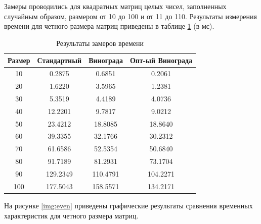 Замеры проводились для квадратных матриц целых чисел, заполненных случайным образом, размером от 10 до 100 и от 11 до 110. Результаты измерения времени для четного размера матриц приведены в таблице \ref{tbl:time_even} (в мс).

\begin{table}[h]
    \begin{center}
        \begin{threeparttable}
        \captionsetup{justification=raggedright,singlelinecheck=off}
        \caption{Результаты замеров времени}
        \label{tbl:time_even}
        \begin{tabular}{|c|c|c|c|}
            \hline
            Размер & Стандартный & Винограда & Опт-ый Винограда  \\
            \hline
		    10 & 0.2875 & 0.6851 & 0.2061 \\
			\hline
			20 & 1.6220 & 3.5965 & 1.2381 \\
			\hline
			30 & 5.3519 & 4.4189 & 4.0736 \\
			\hline
			40 & 12.2201 & 9.7817 & 9.0212 \\
			\hline
			50 & 23.4212 & 18.8085 & 18.8640 \\
			\hline
			60 & 39.3355 & 32.1766 & 30.2312 \\
			\hline
			70 & 61.6586 & 52.5354 & 50.6840 \\
			\hline
			80 & 91.7189 & 81.2931 & 73.1704 \\
			\hline
			90 & 129.2349 & 110.4791 & 104.2271 \\
			\hline
			100 & 177.5043 & 158.5571 & 134.2171 \\
			\hline
		\end{tabular}
    \end{threeparttable}
\end{center}
\end{table}

На рисунке \ref{img:even} приведены графические результаты сравнения временных характеристик для четного размера матриц.

